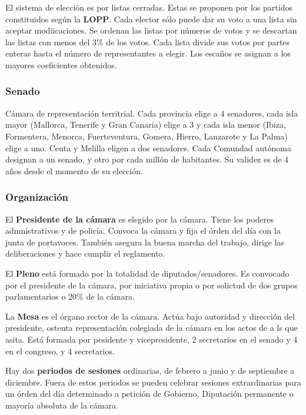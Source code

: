         El sistema de elección es por listas cerradas. Estas se proponen por los partidos constituidos según la \textbf{LOPP}. Cada elector sólo puede dar su voto a una lista sin aceptar modiicaciones. Se ordenan las listas por números de votos y se descartan las listas con menos del 3\% de los votos. Cada lista divide sus votos por partes enteras hasta el número de representantes a elegir. Los escaños se asignan a los mayores coeficientes obtenidos.

    \subsubsection{Senado}
        Cámara de representación territrial. Cada provincia elige a 4 senadores, cada isla mayor (Mallorca, Tenerife y Gran Canaria) elige a 3 y cada isla menor (Ibiza, Formentera, Menorca, Fuerteventura, Gomera, Hierro, Lanzarote y La Palma) elige a uno. Ceuta y Melilla eligen a dos senadores. Cada Comundad autónoma designan a un senado, y otro por cada millón de habitantes. Su validez es de 4 años desde el momento de su elección.

    \subsubsection{Organización}
        El \textbf{Presidente de la cámara} es elegido por la cámara. Tiene los poderes admnistrativos y de policía. Convoca la cámara y fija el órden del día con la junta de portavoces. También asegura la buena marcha del trabajo, dirige las deliberaciones y hace cumplir el reglamento.

        El \textbf{Pleno} está formado por la totalidad de diputados/senadores. Es convocado por el presidente de la cámara, por iniciativa propia o por solictud de dos grupos parlamentarios o 20\% de la cámara.

        La \textbf{Mesa} es el órgano rector de la cámara. Actúa bajo autoridad y dirección del presidente, ostenta representación colegiada de la cámara en los actos de  a ls que asita. Está formada por pesidente y vicepresidente, 2 secretarios en el senado y 4 en el congreso, y 4 secretarios.

        Hay dos \textbf{periodos de sesiones} ordinarias, de febrero a junio y de septiembre a diciembre. Fuera de estos periodos se pueden celebrar sesiones extrardinarias para un órden del día determinado a petición de Gobierno, Diputación permanente o mayoría absoluta de la cámara.

